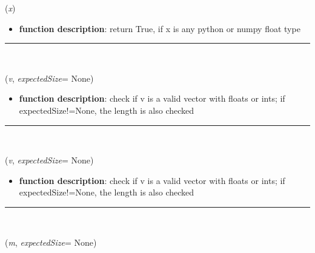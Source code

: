 \begin{itemize}[leftmargin=1.4cm]
\begin{flushleft}
({\it x})
\end{flushleft}
\setlength{\itemindent}{0.7cm}
\begin{itemize}[leftmargin=0.7cm]
\item[--]
{\bf function description}: return True, if x is any python or numpy float type
\vspace{12pt}\end{itemize}
%
\noindent\rule{8cm}{0.75pt}\vspace{1pt} \\ 
\begin{flushleft}
\label{sec:advancedUtilities:IsVector}
({\it v}, {\it expectedSize}= None)
\end{flushleft}
\setlength{\itemindent}{0.7cm}
\begin{itemize}[leftmargin=0.7cm]
\item[--]
{\bf function description}: check if v is a valid vector with floats or ints; if expectedSize!=None, the length is also checked
\vspace{12pt}\end{itemize}
%
\noindent\rule{8cm}{0.75pt}\vspace{1pt} \\ 
\begin{flushleft}
\label{sec:advancedUtilities:IsIntVector}
({\it v}, {\it expectedSize}= None)
\end{flushleft}
\setlength{\itemindent}{0.7cm}
\begin{itemize}[leftmargin=0.7cm]
\item[--]
{\bf function description}: check if v is a valid vector with floats or ints; if expectedSize!=None, the length is also checked
\vspace{12pt}\end{itemize}
%
\noindent\rule{8cm}{0.75pt}\vspace{1pt} \\ 
\begin{flushleft}
\label{sec:advancedUtilities:IsSquareMatrix}
({\it m}, {\it expectedSize}= None)
\end{flushleft}
\setlength{\itemindent}{0.7cm}
\begin{itemize}[leftmargin=0.7cm]

\end{itemize}
\end{itemize}

